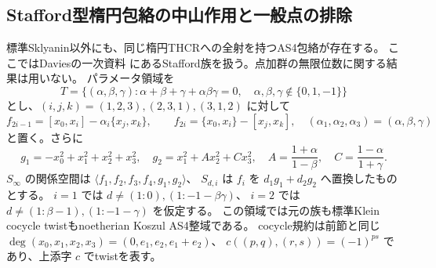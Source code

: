 \subsection{Stafford型楕円包絡の中山作用と一般点の排除}
\label{subsec:stafford-exclusions}
標準Sklyanin以外にも、同じ楕円THCRへの全射を持つAS4包絡が存在する。
ここではDaviesの一次資料\cite[(6.1.3)--(6.1.4), Theorem 6.1.10]{DaviesThesis}
にあるStafford族を扱う。点加群の無限位数に関する結果は用いない。
パラメータ領域を
\[
 T=\{(\alpha,\beta,\gamma):\alpha+\beta+\gamma+\alpha\beta\gamma=0,
 \quad \alpha,\beta,\gamma\notin\{0,1,-1\}\}
\]
とし、$(i,j,k)=(1,2,3),(2,3,1),(3,1,2)$ に対して
\[
 f_{2i-1}=[x_0,x_i]-\alpha_i\{x_j,x_k\},\qquad
 f_{2i}=\{x_0,x_i\}-[x_j,x_k],\quad
 (\alpha_1,\alpha_2,\alpha_3)=(\alpha,\beta,\gamma)
\]
と置く。さらに
\[
 g_1=-x_0^2+x_1^2+x_2^2+x_3^2,\quad
 g_2=x_1^2+A x_2^2+C x_3^2,\quad
 A=\frac{1+\alpha}{1-\beta},\quad C=\frac{1-\alpha}{1+\gamma}.
\]
$S_\infty$ の関係空間は $\langle f_1,f_2,f_3,f_4,g_1,g_2\rangle$、
$S_{d,i}$ は $f_i$ を $d_1g_1+d_2g_2$ へ置換したものとする。
$i=1$ では $d\ne(1:0),(1:-1-\beta\gamma)$、
$i=2$ では $d\ne(1:\beta-1),(1:-1-\gamma)$ を仮定する。
この領域では元の族も標準Klein cocycle twistもnoetherian Koszul AS4整域である。
cocycle規約は前節と同じ $\deg(x_0,x_1,x_2,x_3)=(0,e_1,e_2,e_1+e_2)$、
$c((p,q),(r,s))=(-1)^{ps}$ であり、上添字 $c$ でtwistを表す。

